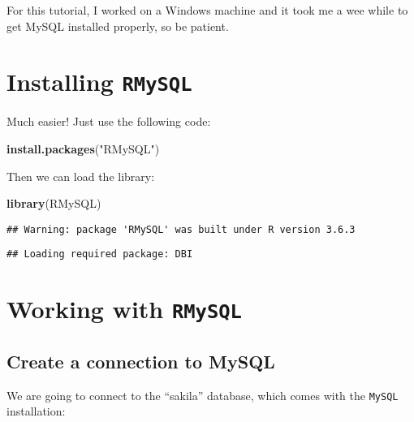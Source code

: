 \documentclass[
]{article}
\newenvironment{Shaded}{\begin{snugshade}}{\end{snugshade}}
\newcommand{\KeywordTok}[1]{\textcolor[rgb]{0.13,0.29,0.53}{\textbf{#1}}}
\newcommand{\NormalTok}[1]{#1}
\newcommand{\StringTok}[1]{\textcolor[rgb]{0.31,0.60,0.02}{#1}}
\begin{document}
For this tutorial, I worked on a Windows machine and it took me a wee
while to get MySQL installed properly, so be patient.

\hypertarget{installing-rmysql}{%
\section{\texorpdfstring{Installing
\texttt{RMySQL}}{Installing RMySQL}}\label{installing-rmysql}}

Much easier! Just use the following code:

\begin{Shaded}
\begin{Highlighting}[]
\KeywordTok{install.packages}\NormalTok{(}\StringTok{"RMySQL"}\NormalTok{)}
\end{Highlighting}
\end{Shaded}

Then we can load the library:

\begin{Shaded}
\begin{Highlighting}[]
\KeywordTok{library}\NormalTok{(RMySQL)}
\end{Highlighting}
\end{Shaded}

\begin{verbatim}
## Warning: package 'RMySQL' was built under R version 3.6.3
\end{verbatim}

\begin{verbatim}
## Loading required package: DBI
\end{verbatim}

\hypertarget{working-with-rmysql}{%
\section{\texorpdfstring{Working with
\texttt{RMySQL}}{Working with RMySQL}}\label{working-with-rmysql}}

\hypertarget{create-a-connection-to-mysql}{%
\subsection{Create a connection to
MySQL}\label{create-a-connection-to-mysql}}

We are going to connect to the ``sakila'' database, which comes with the
\texttt{MySQL} installation:
\end{document}

